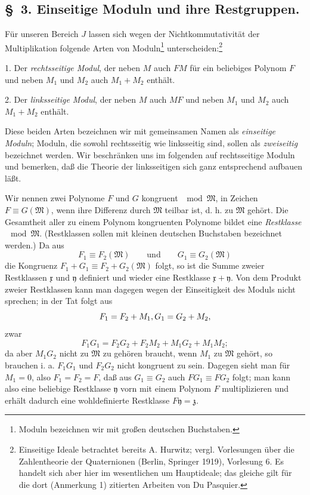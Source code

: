 \documentclass[11pt]{article}
\newcommand{\mM}{\mathfrak{M}}
\newcommand{\mx}{\mathfrak{x}}
\newcommand{\my}{\mathfrak{y}}
\newcommand{\mz}{\mathfrak{z}}
\begin{document}
\subsection*{\S~3. Einseitige Moduln und ihre Restgruppen.}

Für unseren Bereich $J$ lassen sich wegen der Nichtkommutativität der Multiplikation folgende Arten von Moduln\footnote{Moduln bezeichnen wir mit großen deutschen Buchstaben.} unterscheiden:\footnote{Einseitige Ideale betrachtet bereits A. Hurwitz; vergl. Vorlesungen über die Zahlentheorie der Quaternionen (Berlin, Springer 1919), Vorlesung 6. Es handelt sich aber hier im wesentlichen um Hauptideale; das gleiche gilt für die dort (Anmerkung 1) zitierten Arbeiten von Du Pasquier.}

1. Der \emph{rechtsseitige Modul}, der neben $M$ auch $FM$ für ein beliebiges Polynom $F$ und neben $M_1$ und $M_2$ auch $M_1+M_2$ enthält.

2. Der \emph{linksseitige Modul}, der neben $M$ auch $MF$ und neben $M_1$ und $M_2$ auch $M_1+M_2$ enthält.

Diese beiden Arten bezeichnen wir mit gemeinsamen Namen als \emph{einseitige Moduln}; Moduln, die sowohl rechtsseitig wie linksseitig sind, sollen als \emph{zweiseitig} bezeichnet werden. Wir beschränken uns im folgenden auf rechtsseitige Moduln und bemerken, daß die Theorie der linksseitigen sich ganz entsprechend aufbauen läßt.

Wir nennen zwei Polynome $F$ und $G$ kongruent $\mod\mM$, in Zeichen $F\equiv G(\mM)$, wenn ihre Differenz durch $\mM$ teilbar ist, d. h. zu $\mM$ gehört. Die Gesamtheit aller zu einem Polynom kongruenten Polynome bildet eine \emph{Restklasse} $\mod\mM$. (Restklassen sollen mit kleinen deutschen Buchstaben bezeichnet werden.) Da aus
\[
 F_1\equiv F_2(\mM)\qquad\text{und}\qquad G_1\equiv G_2(\mM)
\]
die Kongruenz $F_1+G_1\equiv F_2+G_2(\mM)$ folgt, so ist die Summe zweier Restklassen $\mx$ und $\my$ definiert und wieder eine Restklasse $\mx+\my$. Von dem Produkt zweier Restklassen kann man dagegen wegen der Einseitigkeit des Moduls nicht sprechen; in der Tat folgt aus
\[
 F_1=F_2+M_1,\\ G_1=G_2+M_2,
\]
zwar
\[
 F_1G_1=F_2G_2+F_2M_2+M_1G_2+M_1M_2;
\]
da aber $M_1G_2$ nicht zu $\mM$ zu gehören braucht, wenn $M_1$ zu $\mM$ gehört, so brauchen i. a. $F_1G_1$ und $F_2G_2$ nicht kongruent zu sein. Dagegen sieht man für $M_1=0$, also $F_1=F_2=F$, daß aus $G_1\equiv G_2$ auch $FG_1\equiv FG_2$ folgt; man kann also eine beliebige Restklasse $\my$ vorn mit einem Polynom $F$ multiplizieren und erhält dadurch eine wohldefinierte Restklasse $F\my=\mz$.
\end{document}
